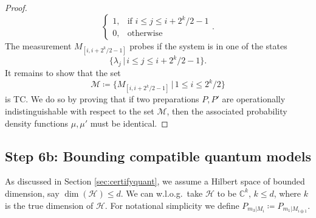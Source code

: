 \begin{proof}
\begin{equation*}
\begin{cases}
    1,& \text{if } i\leq j \leq i+2^k/2-1\\
    0,              & \text{otherwise}
\end{cases}.
\end{equation*}
The measurement $M_{[i,i+2^k/2-1]}$ probes if the system is in one of the states
\begin{equation*}
\{\lambda_j \,\vert\, i\leq j \leq i+2^k/2-1\}.
\end{equation*}
It remains to show that the set
\begin{equation*}
\mathcal{M}\coloneqq\{M_{[i,i+2^k/2-1]}\,\vert\, 1\leq i \leq 2^k/2\}
\end{equation*}
is TC. We do so by proving that if two preparations $P, P'$ are operationally indistinguishable with respect to the set $\mathcal{M}$, then the associated probability density functions $\mu , \mu'$ must be identical.

\end{proof}

\subsection{Step 6b: Bounding compatible quantum models}
\label{sec:boundingmodels}
As discussed in Section \ref{sec:certifyquant}, we assume a Hilbert space of bounded dimension, say $\operatorname{dim}(\mathcal{H})\leq d$. We can w.l.o.g.\ take $\mathcal{H}$ to be $\mathbb{C}^k$, $k\leq d$, where $k$ is the true dimension of $\mathcal{H}$. For notational simplicity we define $P_{m_3\vert M_i}\coloneqq P_{m_1\vert M_{i\oplus 1}}$.

